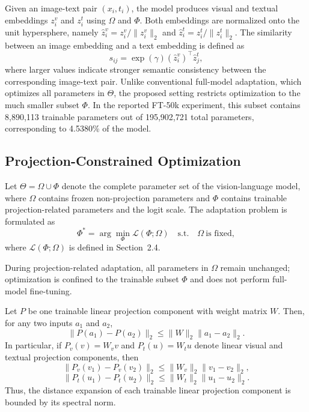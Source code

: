 \documentclass[runningheads]{llncs}
\begin{document}
Given an image-text pair $(x_i,t_i)$, the model produces visual and textual embeddings $z_i^{v}$ and $z_i^{t}$ using $\Omega$ and $\Phi$. Both embeddings are normalized onto the unit hypersphere, namely $\hat{z}_i^{v}=z_i^{v}/\|z_i^{v}\|_2$ and $\hat{z}_i^{t}=z_i^{t}/\|z_i^{t}\|_2$. The similarity between an image embedding and a text embedding is defined as
\begin{equation}
\label{eq:similarity}
s_{ij}=\exp(\gamma)(\hat{z}_i^{v})^{\top}\hat{z}_j^{t},
\end{equation}
where larger values indicate stronger semantic consistency between the corresponding image-text pair. Unlike conventional full-model adaptation, which optimizes all parameters in $\Theta$, the proposed setting restricts optimization to the much smaller subset $\Phi$. In the reported FT-50k experiment, this subset contains 8,890,113 trainable parameters out of 195,902,721 total parameters, corresponding to 4.5380\% of the model.

\subsection{Projection-Constrained Optimization}

Let $\Theta=\Omega\cup\Phi$ denote the complete parameter set of the vision-language model, where $\Omega$ contains frozen non-projection parameters and $\Phi$ contains trainable projection-related parameters and the logit scale. The adaptation problem is formulated as
\begin{equation}
\label{eq:projection_problem}
\Phi^{*}=\arg\min_{\Phi}\mathcal L(\Phi;\Omega)
\quad\text{s.t.}\quad
\Omega\ \text{is fixed},
\end{equation}
where $\mathcal L(\Phi;\Omega)$ is defined in Section~2.4.

During projection-related adaptation, all parameters in $\Omega$ remain unchanged; optimization is confined to the trainable subset $\Phi$ and does not perform full-model fine-tuning.


\begin{proposition}
Let $P$ be one trainable linear projection component with weight matrix $W$. Then, for any two inputs $a_1$ and $a_2$,
\begin{equation}
\|P(a_1)-P(a_2)\|_2 \le \|W\|_2 \|a_1-a_2\|_2.
\label{eq:component_bound}
\end{equation}
In particular, if $P_v(v)=W_vv$ and $P_t(u)=W_tu$ denote linear visual and textual projection components, then
\begin{equation}
\|P_v(v_1)-P_v(v_2)\|_2 \le \|W_v\|_2 \|v_1-v_2\|_2,
\end{equation}
\begin{equation}
\|P_t(u_1)-P_t(u_2)\|_2 \le \|W_t\|_2 \|u_1-u_2\|_2.
\end{equation}
Thus, the distance expansion of each trainable linear projection component is bounded by its spectral norm.
\end{proposition}
\end{document}
